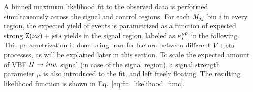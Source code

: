 A binned maximum likelihood fit to the observed data is performed simultaneously across the 
signal and control regions. For each $M_{jj}$ bin $i$ in every region, the expected yield of events
is parametrized as a function of expected strong $\mathrm{Z}(\nu\nu)+\textrm{jets}$ yields in the signal region, labeled as
$\kappa_{i}^{\nu\bar{\nu}}$ in the following. This parametrization is done using transfer factors between different
$V\text{+jets}$ processes, as will be explained later in this section. To scale the expected amount of VBF
$H \rightarrow inv.$ signal (in case of the signal region), a signal strength parameter $\mu$ is also introduced to
the fit, and left freely floating. The resulting likelihood function is shown in Eq.~\ref{eq:fit_likelihood_func}.


% 
% 


